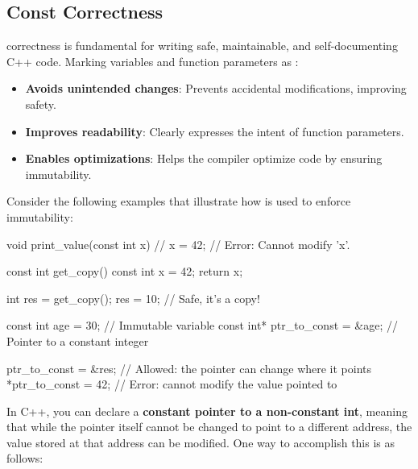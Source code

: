 
\subsection{Const Correctness} \label{const-correctness}

\begin{warningblock}
     correctness is fundamental for writing safe, maintainable, and self-documenting C++ code. Marking variables and function parameters as :
    \begin{itemize}
        \item \textbf{Avoids unintended changes}: Prevents accidental modifications, improving safety.
        \item \textbf{Improves readability}: Clearly expresses the intent of function parameters.
        \item \textbf{Enables optimizations}: Helps the compiler optimize code by ensuring immutability.
    \end{itemize}
\end{warningblock}

Consider the following examples that illustrate how  is used to enforce immutability:

\vspace{-0.5em}
\begin{codeblock}[language=C++, numbers=none]
void print_value(const int x) {
    // x = 42; // Error: Cannot modify 'x'.
}

const int get_copy() {
    const int x = 42;
    return x;
}

int res = get_copy();
res = 10; // Safe, it's a copy!

const int age = 30;              // Immutable variable
const int* ptr_to_const = &age;  // Pointer to a constant integer

ptr_to_const = &res;  // Allowed: the pointer can change where it points
*ptr_to_const = 42;   // Error: cannot modify the value pointed to
\end{codeblock}

In C++, you can declare a \textbf{constant pointer to a non-constant int}, meaning that while the pointer itself cannot be changed to point to a different address, the value stored at that address can be modified. One way to accomplish this is as follows:
    
